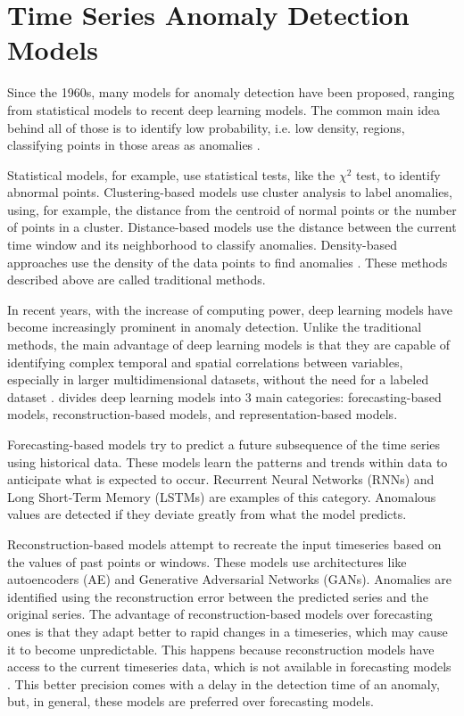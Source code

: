 \section{Time Series Anomaly Detection Models}

Since the 1960s, many models for anomaly detection have been proposed, ranging from statistical models to recent deep learning models. The common main idea behind all of those is to identify low probability, i.e. low density, regions, classifying points in those areas as anomalies \cite{Samariya_Thakkar_2021}. 

Statistical models, for example, use statistical tests, like the $\chi ^2$ test, to identify abnormal points. Clustering-based models use cluster analysis to label anomalies, using, for example, the distance from the centroid of normal points or the number of points in a cluster. Distance-based models use the distance between the current time window and its neighborhood to classify anomalies. Density-based approaches use the density of the data points to find anomalies \cite{Zamanzadeh_Darban_Webb_Pan_Aggarwal_Salehi_2024, Samariya_Thakkar_2021}. These methods described above are called traditional methods.

In recent years, with the increase of computing power, deep learning models have become increasingly prominent in anomaly detection. Unlike the traditional methods, the main advantage of deep learning models is that they are capable of identifying complex temporal and spatial correlations between variables, especially in larger multidimensional datasets, without the need for a labeled dataset \cite{Zamanzadeh_Darban_Webb_Pan_Aggarwal_Salehi_2024, Choi_Yi_Park_Yoon_2021}. \cite{Zamanzadeh_Darban_Webb_Pan_Aggarwal_Salehi_2024} divides deep learning models into 3 main categories: forecasting-based models, reconstruction-based models, and representation-based models.

Forecasting-based models try to predict a future subsequence of the time series using historical data. These models learn the patterns and trends within data to anticipate what is expected to occur. Recurrent Neural Networks (RNNs) and Long Short-Term Memory (LSTMs) are examples of this category. Anomalous values are detected if they deviate greatly from what the model predicts.

Reconstruction-based models attempt to recreate the input timeseries based on the values of past points or windows. These models use architectures like autoencoders (AE) and Generative Adversarial Networks (GANs). Anomalies are identified using the reconstruction error between the predicted series and the original series. The advantage of reconstruction-based models over forecasting ones is that they adapt better to rapid changes in a timeseries, which may cause it to become unpredictable. This happens because reconstruction models have access to the current timeseries data, which is not available in forecasting models \cite{Zamanzadeh_Darban_Webb_Pan_Aggarwal_Salehi_2024}. This better precision comes with a delay in the detection time of an anomaly, but, in general, these models are preferred over forecasting models.

